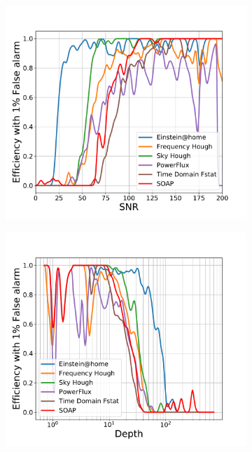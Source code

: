 \begin{figure}
	\begin{subfigure}[h]{0.5\textwidth}
		\includegraphics[width=\columnwidth]{C4_cnn/S6MDC_snr.pdf}
		\caption{\label{machine:results:snr_s6mdc}}
	\end{subfigure}
\begin{subfigure}[h]{0.5\textwidth}
	\includegraphics[width=\columnwidth]{C4_cnn/S6MDC_depth.pdf}
	\caption{\label{machine:results:depth_s6mdc}}
\end{subfigure}


\end{figure}
